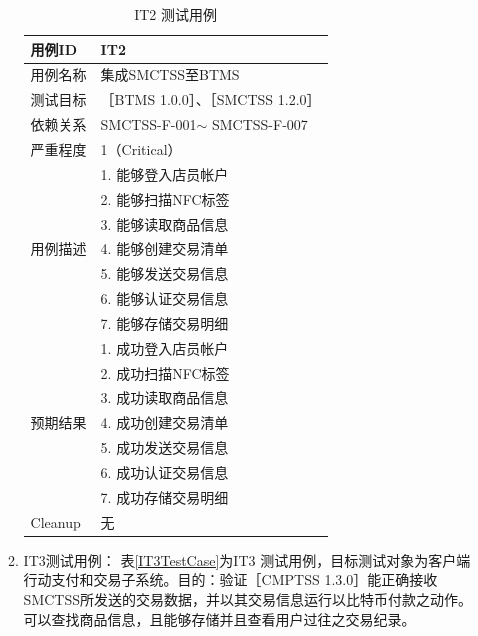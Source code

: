\begin{enumerate}
\begin{enumerate}
						\begin{table}[!htbp]
						\caption{IT2 测试用例} %
						\centering %
						\label{IT2TestCase} %
						\begin{tabular}{|l|l|}
						\hline
						用例ID & IT2 \\ \hline
						用例名称 & 集成SMCTSS至BTMS \\ \hline
						测试目标 & {［}BTMS 1.0.0{］}、{［}SMCTSS 1.2.0{］} \\ \hline
						依赖关系 & SMCTSS-F-001$\sim$ SMCTSS-F-007 \\ \hline
						严重程度 & 1（Critical） \\ \hline
						\multirow{7}{*}{用例描述} & 1.     能够登入店员帐户 \\ \cline{2-2} 
						 & 2.     能够扫描NFC标签 \\ \cline{2-2} 
						 & 3.     能够读取商品信息 \\ \cline{2-2} 
						 & 4.     能够创建交易清单 \\ \cline{2-2} 
						 & 5.     能够发送交易信息 \\ \cline{2-2} 
						 & 6.     能够认证交易信息 \\ \cline{2-2} 
						 & 7.     能够存储交易明细 \\ \hline
						\multirow{7}{*}{预期结果} & 1.     成功登入店员帐户 \\ \cline{2-2} 
						 & 2.     成功扫描NFC标签 \\ \cline{2-2} 
						 & 3.     成功读取商品信息 \\ \cline{2-2} 
						 & 4.     成功创建交易清单 \\ \cline{2-2} 
						 & 5.     成功发送交易信息 \\ \cline{2-2} 
						 & 6.     成功认证交易信息 \\ \cline{2-2} 
						 & 7.     成功存储交易明细 \\ \hline
						Cleanup & 无 \\ \hline
						\end{tabular}
						\end{table}

				\item IT3测试用例：
					表\ref{IT3TestCase}为IT3 测试用例，目标测试对象为客户端行动支付和交易子系统。目的：验证［CMPTSS 1.3.0］能正确接收SMCTSS所发送的交易数据，并以其交易信息运行以比特币付款之动作。可以查找商品信息，且能够存储并且查看用户过往之交易纪录。


\end{enumerate}
\end{enumerate}
